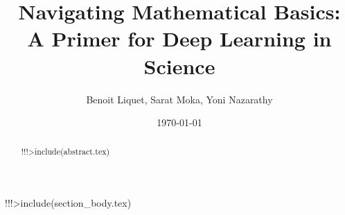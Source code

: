 \documentclass[12pt]{article}
\title{
Navigating Mathematical Basics: \\
A Primer for Deep Learning in Science
}
\date{\today}
\author{Benoit Liquet, Sarat Moka, Yoni Nazarathy} %
\begin{document}
\maketitle
\begin{abstract}
!!!>include(abstract.tex)
\end{abstract}
!!!>include(section_body.tex)


\end{document}

